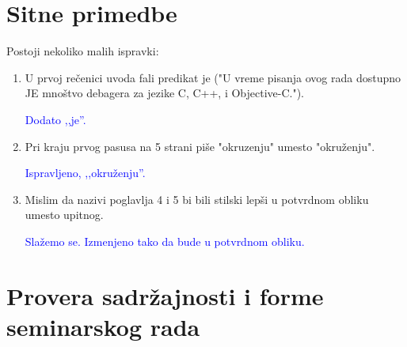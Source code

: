 \documentclass[a4paper]{report}
\newcommand{\odgovor}[1]{\textcolor{blue}{#1}}
\begin{document}
\section{Sitne primedbe}
Postoji nekoliko malih ispravki:
\begin{enumerate}
\item  U prvoj rečenici uvoda fali predikat je ("U vreme pisanja ovog rada dostupno JE mnoštvo debagera za jezike C,
  C++, i Objective-C.").

  \odgovor{Dodato ,,je''.}
\item Pri kraju prvog pasusa na 5 strani piše "okruzenju" umesto "okruženju".

  \odgovor{Ispravljeno, ,,okruženju''.}
  
\item Mislim da nazivi poglavlja 4 i 5 bi bili stilski lepši u potvrdnom obliku umesto upitnog. 
 
\odgovor{Slažemo se. Izmenjeno tako da bude u potvrdnom obliku.}
\end{enumerate}

\section{Provera sadržajnosti i forme seminarskog rada}
\end{document}
